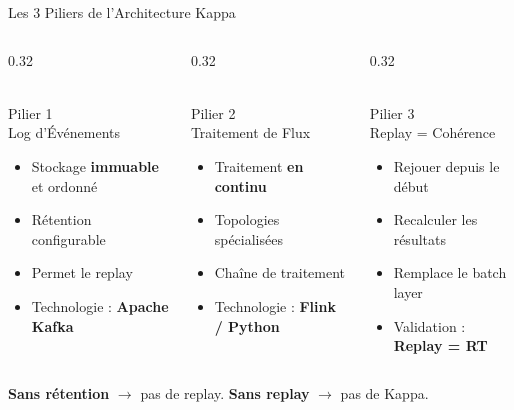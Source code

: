 \documentclass[aspectratio=169, 12pt]{beamer}
\begin{document}
\begin{frame}{Les 3 Piliers de l'Architecture Kappa}
  \begin{columns}[T]
    \begin{column}{0.32\textwidth}
      \begin{block}{\centering \faDatabase\\ Pilier 1\\Log d'Événements}
        \scriptsize
        \begin{itemize}
          \item Stockage \textbf{immuable} et ordonné
          \item Rétention configurable
          \item Permet le replay
          \item Technologie : \textbf{Apache Kafka}
        \end{itemize}
      \end{block}
    \end{column}
    \begin{column}{0.32\textwidth}
      \begin{block}{\centering \faCogs\\ Pilier 2\\Traitement de Flux}
        \scriptsize
        \begin{itemize}
          \item Traitement \textbf{en continu}
          \item Topologies spécialisées
          \item Chaîne de traitement
          \item Technologie : \textbf{Flink / Python}
        \end{itemize}
      \end{block}
    \end{column}
    \begin{column}{0.32\textwidth}
      \begin{block}{\centering \faRedo\\ Pilier 3\\Replay = Cohérence}
        \scriptsize
        \begin{itemize}
          \item Rejouer depuis le début
          \item Recalculer les résultats
          \item Remplace le batch layer
          \item Validation : \textbf{Replay = RT}
        \end{itemize}
      \end{block}
    \end{column}
  \end{columns}
  \vspace{0.4cm}
  \begin{block}{}
    \centering\small
    \textbf{Sans rétention} $\to$ pas de replay. \textbf{Sans replay} $\to$ pas de Kappa.
  \end{block}
\end{frame}
\end{document}
